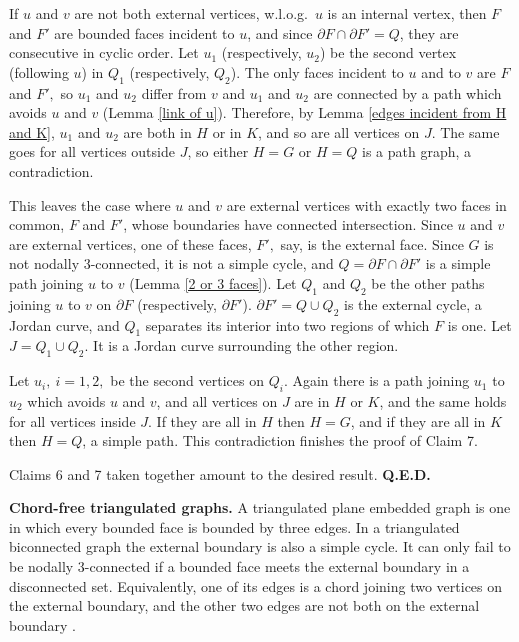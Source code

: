 If $u$ and $v$ are not both external vertices,
w.l.o.g.\
$u$ is an internal vertex, then
$F$ and $F'$ are bounded faces incident to $u$,
and since $\partial F \cap \partial F' = Q$,
they are consecutive in cyclic order.
Let $u_1$ (respectively, $u_2$) be the second
vertex (following $u$) in $Q_1$ (respectively, $Q_2$).
The only faces incident to $u$ and to $v$ are 
$F$ and $F',$ so $u_1$ and $u_2$
differ from $v$ and
$u_1$ and $u_2$ are connected
by a path which avoids $u$ and $v$
(Lemma \ref{link of u}).
Therefore, by Lemma 
\ref{edges incident from H and K}, $u_1$ and $u_2$ are both
in $H$ or in $K$, and so are all vertices on $J$.
The same goes
for all vertices outside $J$, so either $H=G$ or
$H=Q$ is a path graph, a contradiction.


This leaves the case where $u$ and $v$ are external
vertices with exactly
two faces in common, $F$ and $F'$, whose
boundaries have connected intersection.
Since $u$ and $v$ are external vertices,
one of these faces,
$F',$ say, is the external face.
Since $G$ is not nodally 3-connected, it is not
a simple cycle, and $Q = \partial F\cap \partial F'$ is a simple path
joining $u$ to $v$ (Lemma \ref{2 or 3 faces}).
Let $Q_1$ and $Q_2$ be the other paths
joining $u$ to $v$ on $\partial F$ (respectively,
$\partial F'$). $\partial F' = Q \cup Q_2$ is the
external cycle, a Jordan curve, and $Q_1$ separates
its interior into two regions of which $F$ is one.
Let $J=Q_1\cup Q_2$. It is a Jordan curve surrounding
the other region.

Let $u_i,~ i=1,2,$ be the second vertices
on $Q_i$. Again
there is a path joining $u_1$ to $u_2$ which
avoids $u$ and $v$, and
all vertices on $J$ are in $H$ or $K$, and
the same holds for all vertices inside $J$.
If they are all in $H$ then $H=G$, and if they
are all in $K$ then $H=Q$, a simple path.
This contradiction finishes the proof of Claim 7.

Claims 6 and 7 taken together amount to the desired result.
{\bf Q.E.D.}\medskip

\numpara
\label{chord-free triangulated graphs} {\bf Chord-free triangulated graphs.}
A triangulated plane embedded graph is one in which every
bounded face is bounded by three edges.  In a triangulated
biconnected graph the external boundary is also a simple cycle.
It can only fail to be nodally 3-connected if a bounded
face meets the external boundary in a disconnected set.
Equivalently, one of its edges is a chord joining
two vertices on the external boundary,
and the other two edges are not both on the external boundary
\cite{white}.

